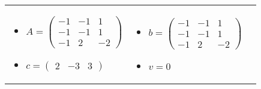 \begin{enumerate}
\begin{scriptsize}
\begin{tabular}{m{5cm}m{5cm}m{5cm}}
        \begin{itemize}
            \item $A = 
                \begin{pmatrix}
                    -1 & -1 & 1 \\
                    -1 & -1 & 1 \\
                    -1 & 2 & -2 
                \end{pmatrix} $
            \item $c = 
                \begin{pmatrix}
                    2 & -3 & 3
                \end{pmatrix} $
            \end{itemize}
            &
        \begin{itemize}
            \item $b =  
                \begin{pmatrix}
                    -1 & -1 & 1 \\
                    -1 & -1 & 1 \\
                    -1 & 2 & -2 
                \end{pmatrix} $
            \item $v = 0 $
            \end{itemize}
            \end{tabular}
        \end{scriptsize}
\end{enumerate}

